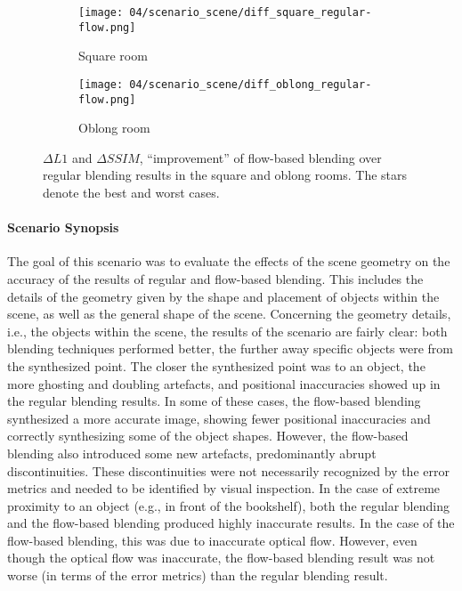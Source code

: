 \begin{figure}
\centering
    \hfill
    \begin{subfigure}[b]{0.45\textwidth}
            \centering
            \texttt{[image: 04/scenario\_scene/diff\_square\_regular-flow.png]}
            \caption{Square room}
    \end{subfigure}
    \hfill
    \begin{subfigure}[b]{0.45\textwidth}
            \centering
            \texttt{[image: 04/scenario\_scene/diff\_oblong\_regular-flow.png]}
            \caption{Oblong room}
    \end{subfigure}
    \hfill
  \caption[Improvement of flow-based blending results over regular blending results in the square and oblong rooms]{$\Delta L1$ and $\Delta SSIM$, ``improvement'' of flow-based blending over regular blending results in the square and oblong rooms. The stars denote the best and worst cases.} \label{fig:scene_diff_square_oblong}
\end{figure}

\paragraph{Scenario Synopsis}
The goal of this scenario was to evaluate the effects of the scene geometry on the accuracy of the results of regular and flow-based blending. This includes the details of the geometry given by the shape and placement of objects within the scene, as well as the general shape of the scene.
Concerning the geometry details, i.e., the objects within the scene, the results of the scenario are fairly clear: both blending techniques performed better, the further away specific objects were from the synthesized point. The closer the synthesized point was to an object, the more ghosting and doubling artefacts, and positional inaccuracies showed up in the regular blending results.
In some of these cases, the flow-based blending synthesized a more accurate image, showing fewer positional inaccuracies and correctly synthesizing some of the object shapes. However, the flow-based blending also introduced some new artefacts, predominantly abrupt discontinuities. These discontinuities were not necessarily recognized by the error metrics and needed to be identified by visual inspection. In the case of extreme proximity to an object (e.g., in front of the bookshelf), both the regular blending and the flow-based blending produced highly inaccurate results. In the case of the flow-based blending, this was due to inaccurate optical flow. However, even though the optical flow was inaccurate, the flow-based blending result was not worse (in terms of the error metrics) than the regular blending result.

